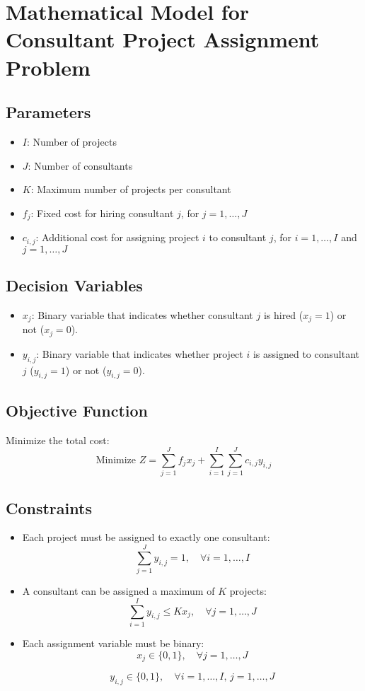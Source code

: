 \documentclass{article}
\begin{document}
\section*{Mathematical Model for Consultant Project Assignment Problem}

\subsection*{Parameters}
\begin{itemize}
    \item $I$: Number of projects
    \item $J$: Number of consultants
    \item $K$: Maximum number of projects per consultant
    \item $f_j$: Fixed cost for hiring consultant $j$, for $j = 1, \ldots, J$
    \item $c_{i,j}$: Additional cost for assigning project $i$ to consultant $j$, for $i = 1, \ldots, I$ and $j = 1, \ldots, J$
\end{itemize}

\subsection*{Decision Variables}
\begin{itemize}
    \item $x_{j}$: Binary variable that indicates whether consultant $j$ is hired ($x_{j} = 1$) or not ($x_{j} = 0$).
    \item $y_{i,j}$: Binary variable that indicates whether project $i$ is assigned to consultant $j$ ($y_{i,j} = 1$) or not ($y_{i,j} = 0$).
\end{itemize}

\subsection*{Objective Function}
Minimize the total cost:
\[
\text{Minimize } Z = \sum_{j=1}^{J} f_j x_j + \sum_{i=1}^{I} \sum_{j=1}^{J} c_{i,j} y_{i,j}
\]

\subsection*{Constraints}
\begin{itemize}
    \item Each project must be assigned to exactly one consultant:
    \[
    \sum_{j=1}^{J} y_{i,j} = 1, \quad \forall i = 1, \ldots, I
    \]
    
    \item A consultant can be assigned a maximum of $K$ projects:
    \[
    \sum_{i=1}^{I} y_{i,j} \leq K x_j, \quad \forall j = 1, \ldots, J
    \]
    
    \item Each assignment variable must be binary:
    \[
    x_j \in \{0, 1\}, \quad \forall j = 1, \ldots, J
    \]
    
    \[
    y_{i,j} \in \{0, 1\}, \quad \forall i = 1, \ldots, I, \, j = 1, \ldots, J
    \]
\end{itemize}
\end{document}
